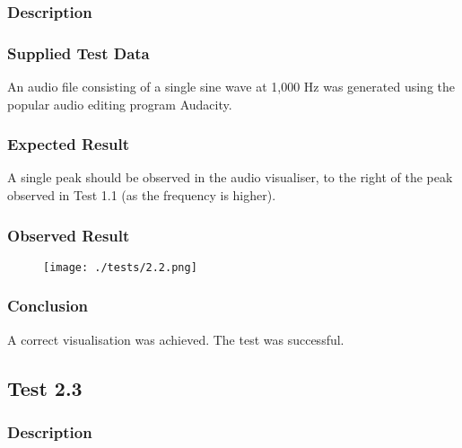 \subsubsection*{Description}
\paragraph{}
{
	\centering
}

\subsubsection*{Supplied Test Data}
An audio file consisting of a single sine wave at 1,000 Hz was generated using the popular audio editing program Audacity.

\subsubsection*{Expected Result}
A single peak should be observed in the audio visualiser, to the right of the peak observed in Test 1.1 (as the frequency is higher).

\subsubsection*{Observed Result}
\label{sec:evidence2.2}
\begin{figure}[H]
	\texttt{[image: ./tests/2.2.png]}
\end{figure}

\subsubsection*{Conclusion}
A correct visualisation was achieved. The test was successful.

\pagebreak
\subsection{Test 2.3}
\subsubsection*{Description}
\paragraph{}
{
	\centering
}

